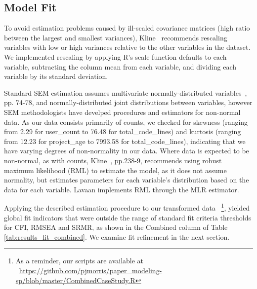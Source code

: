 \subsection{Model Fit} 

To avoid estimation problems caused by ill-scaled covariance matrices (high ratio between the largest and smallest variances), Kline~\cite{kline2015principles} recommends rescaling variables with low or high variances relative to the other variables in the dataset. We implemented rescaling by applying R's scale function defaults to each variable, subtracting the column mean from each variable, and dividing each variable by its standard deviation.

Standard SEM estimation assumes multivariate normally-distributed variables~\cite{kline2015principles}, pp. 74-78, and normally-distributed joint distributions between variables, however SEM methodologists have develped procedures and estimators for non-normal data. As our data consists primarily of counts, we checked for skewness (ranging from 2.29 for user\_count to 76.48 for total\_code\_lines) and kurtosis (ranging from 12.23 for project\_age to 7993.58 for total\_code\_lines), indicating that we have varying degrees of non-normality in our data. Where data is expected to be non-normal, as with counts, Kline~\cite{kline2015principles}, pp.238-9, recommends  using robust maximum likelihood (RML) to estimate the model, as it does not assume normality, but estimates parameters for each variable's distribution based on the data for each variable. Lavaan implements RML through the MLR estimator. 
 
Applying the described estimation procedure to our transformed data ~\footnote{As a reminder, our scripts are available at ~\url{https://github.com/pjmorris/paper_modeling-sp/blob/master/CombinedCaseStudy.R}}, yielded global fit indicators that were outside the range of standard fit criteria thresholds for CFI, RMSEA and SRMR, as shown in the Combined column of Table \ref{tab:results_fit_combined}. We examine fit refinement in the next section. 


